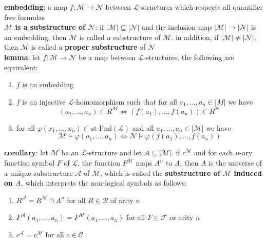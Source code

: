 \documentclass[a4paper]{article}
\newcommand\abs[1]{\ensuremath{\lvert#1\rvert}}
\begin{document}
\begin{framed}
	\noindent
	\textbf{embedding}: a map $f: \mathscr{M} \rightarrow \mathscr{N}$ between $\mathscr{L}$-structures which respects all quantifier free formulas\\
	\textbf{$\mathscr{M}$ is a substructure of $\mathscr{N}$}: if $\abs{\mathscr{M}} \subseteq \abs{\mathscr{N}}$ and the inclusion map $\abs{\mathscr{M}} \rightarrow \abs{\mathscr{N}}$ is an embedding, then $\mathscr{M}$ is called a substructure of $\mathscr{M}$. in addition, if $\abs{\mathscr{M}} \neq \abs{\mathscr{N}}$, then $\mathscr{M}$ is called a \textbf{proper substructure} of $\mathscr{N}$\\
	\textbf{lemma}: let $f: \mathscr{M} \rightarrow \mathscr{N}$ be a map between $\mathscr{L}$-structures. the following are equivalent:
		\begin{enumerate}[label=(\roman*), itemsep=-3pt, topsep=0pt]
			\item $f$ is an embedding
			\item $f$ is an injective $\mathscr{L}$-homomorphism such that for all $a_1, \dots, a_n \in \abs{M}$ we have
			$$(a_1, \dots, a_n) \in R^\mathscr{M} \iff (f(a_1), \dots, f(a_n)) \in R^\mathscr{N}$$
			\item for all $\varphi(x_1, \dots, x_n) \in \text{at-Fml}(\mathscr{L})$ and all $a_1, \dots, a_n \in \abs{\mathscr{M}}$ we have
			$$\mathscr{M} \models \varphi(a_1, \dots, a_n) \iff \mathscr{N} \models \varphi(f(a_1), \dots, f(a_n))$$
		\end{enumerate}
		
	\noindent
	\textbf{corollary}: let $\mathscr{M}$ be an $\mathscr{L}$-structure and let $A \subseteq \abs{\mathscr{M}}$. if $c^\mathscr{M}$ and for each $n$-ary function symbol $F$ of $\mathscr{L}$, the function $F^\mathscr{M}$ maps $A^n$ to $A$, then $A$ is the universe of a unique substructure $\mathscr{A}$ of $\mathscr{M}$, which is called the \textbf{substructure of $\mathscr{M}$ induced on $A$}, which interprets the non-logical symbols as follows:
		\begin{enumerate}[label=(\roman*), itemsep=-3pt, topsep=0pt]
			\item $R^\mathscr{A} = R^\mathscr{M} \cap A^n$ for all $R \in \mathscr{R}$ of arity $n$
			\item $F^\mathscr{A}(a_1, \dots, a_n) = F^\mathscr{M}(a_1, \dots, a_n)$ for all $F \in \mathscr{F}$ or arity $n$
			\item $c^\mathscr{A} = c^\mathscr{M}$ for all $c \in \mathscr{C}$\\
		\end{enumerate}
	

\end{framed}
\end{document}
